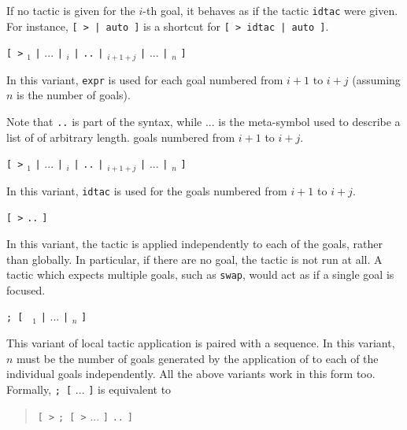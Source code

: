 \begin{Variants}
  \item If no tactic is given for the $i$-th goal, it behaves as if
    the tactic {\tt idtac} were given. For instance, {\tt [~> | auto
    ]} is a shortcut for {\tt [ > idtac | auto ]}.

  \item {\tt [ >} {\tacexpr}$_1$ {\tt |} $...$ {\tt |}
    {\tacexpr}$_i$ {\tt |} {\tacexpr} {\tt ..} {\tt |}
    {\tacexpr}$_{i+1+j}$ {\tt |} $...$ {\tt |} {\tacexpr}$_n$ {\tt ]}

  In this variant, {\tt expr} is used for each goal numbered from
  $i+1$ to $i+j$ (assuming $n$ is the number of goals).

  Note that {\tt ..} is part of the syntax, while $...$ is the meta-symbol used
  to describe a list of {\tacexpr} of arbitrary length.
  goals numbered from $i+1$ to $i+j$.

  \item {\tt [ >} {\tacexpr}$_1$ {\tt |} $...$ {\tt |}
    {\tacexpr}$_i$ {\tt |} {\tt ..} {\tt |} {\tacexpr}$_{i+1+j}$ {\tt |}
    $...$ {\tt |} {\tacexpr}$_n$ {\tt ]}

  In this variant, {\tt idtac} is used for the goals numbered from
  $i+1$ to $i+j$.

  \item {\tt [ >} {\tacexpr} {\tt ..} {\tt ]}

    In this variant, the tactic {\tacexpr} is applied independently to
    each of the goals, rather than globally. In particular, if there
    are no goal, the tactic is not run at all. A tactic which
    expects multiple goals, such as {\tt swap}, would act as if a single
    goal is focused.

  \item {\tacexpr} {\tt ; [ } {\tacexpr}$_1$ {\tt |} $...$ {\tt |} {\tacexpr}$_n$ {\tt ]} 

    This variant of local tactic application is paired with a
    sequence.  In this variant, $n$ must be the number of goals
    generated by the application of {\tacexpr} to each of the
    individual goals independently. All the above variants work in
    this form too. Formally, {\tacexpr} {\tt ; [} $...$ {\tt ]} is
    equivalent to
    \begin{quote}
    {\tt [ >} {\tacexpr} {\tt ; [ >} $...$ {\tt ]} {\tt ..} {\tt ]}
    \end{quote}

\end{Variants}



